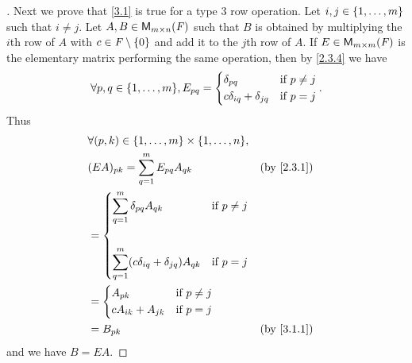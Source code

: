 \begin{proof}[]
	Next we prove that \cref{3.1} is true for a type 3 row operation.
	Let \(i, j \in \left\lbrace1, \dots, m\right\rbrace\) such that \(i \neq j\).
	Let \(A, B \in \MS\) such that \(B\) is obtained by multiplying the \(i\)th row of \(A\) with \(c \in \mathit{F} \setminus \left\lbrace0\right\rbrace\) and add it to the \(j\)th row of \(A\).
	If \(E \in \ms[m][m][\F]\) is the elementary matrix performing the same operation, then by \cref{2.3.4} we have
	\[
		\forall p, q \in \set{1, \dots, m}, E_{p q} = \begin{dcases}
			\delta_{p q}                  & \text{if } p \neq j \\
			c \delta_{i q} + \delta_{j q} & \text{if } p = j
		\end{dcases}.
	\]
	Thus
	\begin{align*}
		 & \forall (p, k) \in \set{1, \dots, m} \times \set{1, \dots, n},                                                        \\
		 & (EA)_{p k} = \sum_{q = 1}^m E_{p q} A_{q k}                                                           &  & \by{2.3.1} \\
		 & = \begin{dcases}
			     \sum_{q = 1}^m \delta_{p q} A_{q k}                    & \text{if } p \neq j \\                    \\
			     \sum_{q = 1}^m (c \delta_{i q} + \delta_{j q}) A_{q k} & \text{if } p = j
		     \end{dcases}                  \\
		 & = \begin{dcases}
			     A_{p k}             & \text{if } p \neq j \\
			     c A_{i k} + A_{j k} & \text{if } p = j
		     \end{dcases}                                                                           \\
		 & = B_{p k}                                                                                             &  & \by{3.1.1}
	\end{align*}
	and we have \(B = EA\).


\end{proof}
